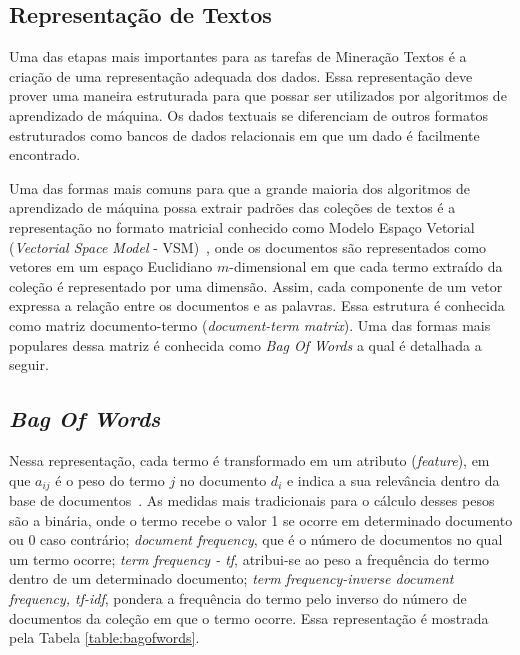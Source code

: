 \subsection*{Representação de Textos} 
\label{section:RepTextos}

Uma das etapas mais importantes para as tarefas de Mineração Textos é a criação de uma representação adequada dos dados. Essa representação deve prover uma maneira estruturada para que possar ser utilizados por algoritmos de aprendizado de máquina. Os dados textuais se diferenciam de outros formatos estruturados como bancos de dados relacionais em que um dado é facilmente encontrado. 




Uma das formas mais comuns para que a grande maioria dos algoritmos de aprendizado de máquina possa extrair padrões das coleções de textos é a representação no formato matricial conhecido como Modelo Espaço Vetorial (\textit{Vectorial Space Model} - VSM)~\cite{Rezende2003}, onde os documentos são representados como vetores em um espaço Euclidiano $m$-dimensional em que cada termo extraído da coleção é representado por uma dimensão. Assim, cada componente de um vetor expressa a relação entre os documentos e as palavras. Essa estrutura é conhecida como matriz documento-termo (\textit{document-term matrix}). Uma das formas mais populares dessa matriz é conhecida como \textit{Bag Of Words} a qual é detalhada a seguir.
	

\subsection*{\textit{Bag Of Words}}
		
Nessa representação, cada termo é transformado em um atributo  (\textit{feature}), em que $a_{ij}$ é o peso do termo $j$ no documento $d_i$ e indica a sua relevância dentro da base de documentos~\cite{Rezende2003}. As medidas mais tradicionais para o cálculo desses pesos são a binária, onde o termo recebe o valor 1 se ocorre em determinado documento ou 0 caso contrário; \textit{document frequency}, que é o número de documentos no qual um termo ocorre; \textit{term frequency - tf}, atribui-se ao peso a frequência do termo dentro de um determinado documento; \textit{term frequency-inverse document frequency, tf-idf}, pondera a frequência do termo pelo inverso do número de documentos da coleção em que o termo ocorre.
Essa representação é mostrada pela Tabela \ref{table:bagofwords}.

